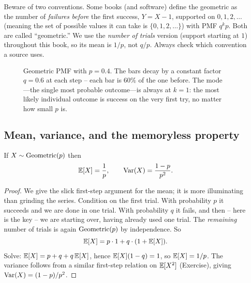 \begin{marginnotebox}
Beware of two conventions. Some books (and software) define the geometric as the
number of \emph{failures before} the first success, $Y = X - 1$, supported on
$0,1,2,\dots$ (meaning the set of possible values it can take is
$\{0,1,2,\dots\}$) with PMF $q^k p$. Both are called ``geometric.'' We use the
\emph{number of trials} version (support starting at $1$) throughout this book, so
its mean is $1/p$, not $q/p$. Always check which convention a source uses.
\end{marginnotebox}

\begin{figure}[H]
\centering
{}
\caption{Geometric PMF with $p=0.4$. The bars decay by a constant factor $q=0.6$
at each step -- each bar is $60\%$ of the one before. The mode---the single most
probable outcome---is always at $k=1$: the most likely individual outcome is
success on the very first try, no matter how small $p$ is.}
\label{ch07:fig-geom-pmf}
\end{figure}

\subsection{Mean, variance, and the memoryless property}
\label{ch07:geom-mem}

\begin{proposition}
\label{ch07:geom-mv}
If $X \sim \operatorname{Geometric}(p)$ then
\[
  \operatorname{\mathbb{E}}[X] = \frac{1}{p}, \qquad \operatorname{Var}(X) = \frac{1-p}{p^{2}}.
\]
\end{proposition}

\begin{proof}
We give the slick first-step argument for the mean; it is more illuminating than
grinding the series. Condition on the first trial. With probability $p$ it
succeeds and we are done in one trial. With probability $q$ it fails, and then --
here is the key -- we are starting over, having already used one trial. The
\emph{remaining} number of trials is again $\operatorname{Geometric}(p)$ by independence. So
\[
  \operatorname{\mathbb{E}}[X] = p \cdot 1 + q \cdot (1 + \operatorname{\mathbb{E}}[X]).
\]
Solve: $\operatorname{\mathbb{E}}[X] = p + q + q\operatorname{\mathbb{E}}[X]$, hence $\operatorname{\mathbb{E}}[X](1-q) = 1$, so $\operatorname{\mathbb{E}}[X] = 1/p$. The
variance follows from a similar first-step relation on $\operatorname{\mathbb{E}}[X^2]$ (Exercise),
giving $\operatorname{Var}(X) = (1-p)/p^2$.
\end{proof}

